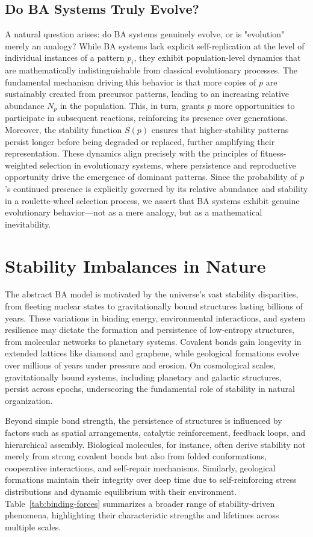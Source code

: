 \documentclass[entropy,article,submit,pdftex,moreauthors]{Definitions/mdpi}
\begin{document}
\subsection{Do BA Systems Truly Evolve?}

A natural question arises: do BA systems genuinely evolve, or is "evolution" merely an analogy? While BA systems lack explicit self-replication at the level of individual instances of a pattern $p_i$, they exhibit population-level dynamics that are mathematically indistinguishable from classical evolutionary processes. The fundamental mechanism driving this behavior is that more copies of $p$ are sustainably created from precursor patterns, leading to an increasing relative abundance $N_p$ in the population. This, in turn, grants $p$ more opportunities to participate in subsequent reactions, reinforcing its presence over generations. Moreover, the stability function $S(p)$ ensures that higher-stability patterns persist longer before being degraded or replaced, further amplifying their representation. These dynamics align precisely with the principles of fitness-weighted selection in evolutionary systems, where persistence and reproductive opportunity drive the emergence of dominant patterns. Since the probability of $p$'s continued presence is explicitly governed by its relative abundance and stability in a roulette-wheel selection process, we assert that BA systems exhibit genuine evolutionary behavior—not as a mere analogy, but as a mathematical inevitability.


\section{Stability Imbalances in Nature}

The abstract BA model is motivated by the universe’s vast stability disparities, from fleeting nuclear states to gravitationally bound structures lasting billions of years. These variations in binding energy, environmental interactions, and system resilience may dictate the formation and persistence of low-entropy structures, from molecular networks to planetary systems. Covalent bonds gain longevity in extended lattices like diamond and graphene, while geological formations evolve over millions of years under pressure and erosion. On cosmological scales, gravitationally bound systems, including planetary and galactic structures, persist across epochs, underscoring the fundamental role of stability in natural organization.

Beyond simple bond strength, the persistence of structures is influenced by factors such as spatial arrangements, catalytic reinforcement, feedback loops, and hierarchical assembly. Biological molecules, for instance, often derive stability not merely from strong covalent bonds but also from folded conformations, cooperative interactions, and self-repair mechanisms. Similarly, geological formations maintain their integrity over deep time due to self-reinforcing stress distributions and dynamic equilibrium with their environment. Table~\ref{tab:binding-forces} summarizes a broader range of stability-driven phenomena, highlighting their characteristic strengths and lifetimes across multiple scales.
\end{document}

